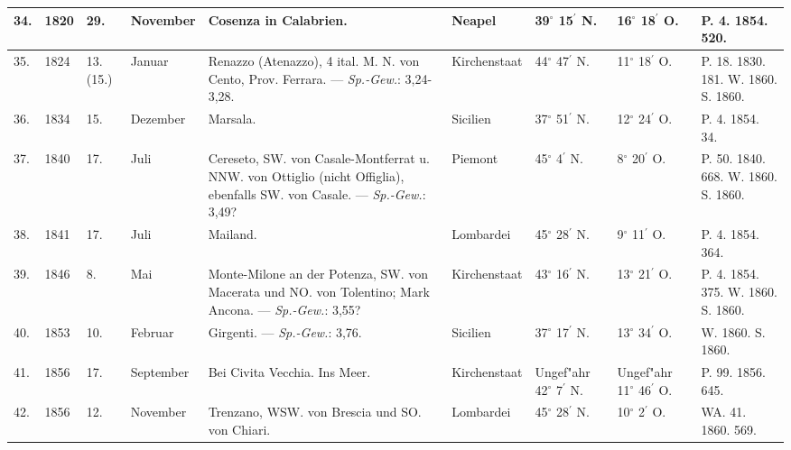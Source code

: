 \documentclass[a4paper, 8pt, oneside, polutonikogreek, german]{article}
\begin{document}
\begin{center}
\begin{longtable}{|p{3mm}|p{13mm}|p{5mm}|p{16mm}|p{25mm}|p{18mm}|p{13mm}|p{13mm}|p{13mm}|}
        34. & 1820 & 29. & November & Cosenza in Calabrien. & Neapel & 39$^\circ$ 15$^\prime$ N. & 16$^\circ$ 18$^\prime$ O. & P. 4. 1854. 520. \\ \hline
        35. & 1824 & 13. (15.) & Januar & Renazzo (Atenazzo), 4 ital. M. N. von Cento, Prov. Ferrara. --- \emph{Sp.-Gew.}: 3,24-3,28. & Kirchenstaat & 44$^\circ$ 47$^\prime$ N. & 11$^\circ$ 18$^\prime$ O. & P. 18. 1830. 181. W. 1860. S. 1860. \\ \hline
        36. & 1834 & 15. & Dezember & Marsala. & Sicilien & 37$^\circ$ 51$^\prime$ N. & 12$^\circ$ 24$^\prime$ O. & P. 4. 1854. 34. \\ \hline
        37. & 1840 & 17. & Juli & Cereseto, SW. von Casale-Montferrat u. NNW. von Ottiglio (nicht Offiglia), ebenfalls SW. von Casale. --- \emph{Sp.-Gew.}: 3,49? & Piemont & 45$^\circ$ 4$^\prime$ N. & 8$^\circ$ 20$^\prime$ O. & P. 50. 1840. 668. W. 1860. S. 1860. \\ \hline
        38. & 1841 & 17. & Juli & Mailand. & Lombardei & 45$^\circ$ 28$^\prime$ N. & 9$^\circ$ 11$^\prime$ O. & P. 4. 1854. 364. \\ \hline
        39. & 1846 & 8. & Mai & Monte-Milone an der Potenza, SW. von Macerata und NO. von Tolentino; Mark Ancona. --- \emph{Sp.-Gew.}: 3,55? & Kirchenstaat & 43$^\circ$ 16$^\prime$ N. & 13$^\circ$ 21$^\prime$ O. & P. 4. 1854. 375. W. 1860. S. 1860. \\ \hline
        40. & 1853 & 10. & Februar & Girgenti. --- \emph{Sp.-Gew.}: 3,76. & Sicilien & 37$^\circ$ 17$^\prime$ N. & 13$^\circ$ 34$^\prime$ O. & W. 1860. S. 1860. \\ \hline
        41. & 1856 & 17. & September & Bei Civita Vecchia. Ins Meer. & Kirchenstaat & Ungef"ahr 42$^\circ$ 7$^\prime$ N. & Ungef"ahr 11$^\circ$ 46$^\prime$ O. & P. 99. 1856. 645. \\ \hline
        42. & 1856 & 12. & November & Trenzano, WSW. von Brescia und SO. von Chiari. & Lombardei & 45$^\circ$ 28$^\prime$ N. & 10$^\circ$ 2$^\prime$ O. & WA. 41. 1860. 569. \\ \hline
    \end{longtable}
\end{center}
\end{document}
